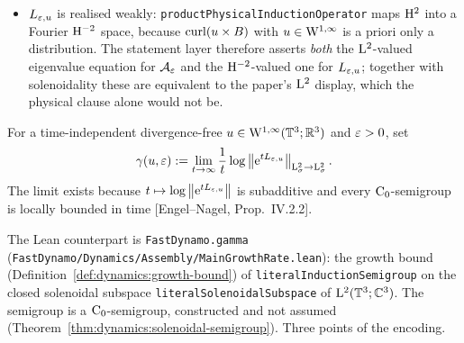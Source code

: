 \begin{itemize}
    subspace of $\Lp^2(\T^3;\CC^3)$ enters only with the semigroup,
    Definition~\ref{def:main:growth-rate}).  Solenoidality of a field is the
    side condition \texttt{productDivergenceFromH2 V = 0}, and the operators are
    defined on all vector fields, as $\mathcal{A}_\eps$ is.
  \item $L_{\varepsilon,u}$ is realised weakly: \texttt{productPhysicalInductionOperator}
    maps $\mathrm{H}^2$ into a Fourier $\mathrm{H}^{-2}$ space, because $\operatorname{curl}(u\times B)$ with
    $u\in\mathrm{W}^{1,\infty}$ is a priori only a distribution.  The statement layer
    therefore asserts \emph{both} the $\mathrm{L}^2$-valued eigenvalue equation for
    $\mathcal{A}_\eps$ and the $\mathrm{H}^{-2}$-valued one for $L_{\varepsilon,u}$; together
    with solenoidality these are equivalent to the paper's $\mathrm{L}^2$
    display, which the physical clause alone would not be.
\end{itemize}

\begin{definition}
  \label{def:main:growth-rate}
  \leanok
  For a time-independent divergence-free $u\in\mathrm{W}^{1,\infty}(\mathbb{T}^3;\mathbb{R}^3)$ and
  $\varepsilon>0$, set
  \begin{equation}
    \gamma(u,\varepsilon)
    :=\lim_{t\to\infty}\frac1t
    \log\left\|\mathrm{e}^{tL_{\varepsilon,u}}\right\|_{\mathrm{L}^2_\sigma\to\mathrm{L}^2_\sigma}.
    \label{eq:main:semigroup-growth-rate}
  \end{equation}
  The limit exists because $t\mapsto\log\left\|\mathrm{e}^{tL_{\varepsilon,u}}\right\|$ is subadditive
  and every $\mathrm{C}_0$-semigroup is locally bounded in time
  [Engel--Nagel, Prop.~IV.2.2].
\end{definition}

The Lean counterpart is \texttt{FastDynamo.gamma}
(\texttt{FastDynamo/Dynamics/Assembly/MainGrowthRate.lean}): the growth bound
(Definition~\ref{def:dynamics:growth-bound}) of
\texttt{literalInductionSemigroup} on the closed solenoidal subspace
\texttt{literalSolenoidalSubspace} of $\Lp^2(\T^3;\CC^3)$.  The semigroup is a
$\mathrm{C}_0$-semigroup, constructed and not assumed
(Theorem~\ref{thm:dynamics:solenoidal-semigroup}).  Three points of the encoding.

